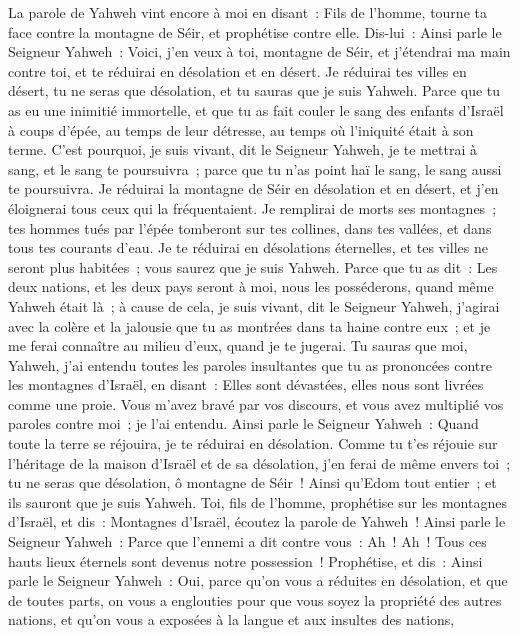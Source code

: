 \begin{multicols}{2}
\VerseOne{}La parole de Yahweh vint encore à moi en disant~:
Fils de l'homme, tourne ta face contre la montagne de Séir, et prophétise contre elle.
Dis-lui~: Ainsi parle le Seigneur Yahweh~: Voici, j'en veux à toi, montagne de Séir, et j'étendrai ma main contre toi, et te réduirai en désolation et en désert.
Je réduirai tes villes en désert, tu ne seras que désolation, et tu sauras que je suis Yahweh.
Parce que tu as eu une inimitié immortelle, et que tu as fait couler le sang des enfants d'Israël à coups d'épée, au temps de leur détresse, au temps où l'iniquité était à son terme.
C'est pourquoi, je suis vivant, dit le Seigneur Yahweh, je te mettrai à sang, et le sang te poursuivra~; parce que tu n'as point haï le sang, le sang aussi te poursuivra.
Je réduirai la montagne de Séir en désolation et en désert, et j'en éloignerai tous ceux qui la fréquentaient.
Je remplirai de morts ses montagnes~; tes hommes tués par l'épée tomberont sur tes collines, dans tes vallées, et dans tous tes courants d'eau.
Je te réduirai en désolations éternelles, et tes villes ne seront plus habitées~; vous saurez que je suis Yahweh.
Parce que tu as dit~: Les deux nations, et les deux pays seront à moi, nous les posséderons, quand même Yahweh était là~;
à cause de cela, je suis vivant, dit le Seigneur Yahweh, j'agirai avec la colère et la jalousie que tu as montrées dans ta haine contre eux~; et je me ferai connaître au milieu d'eux, quand je te jugerai.
Tu sauras que moi, Yahweh, j'ai entendu toutes les paroles insultantes que tu as prononcées contre les montagnes d'Israël, en disant~: Elles sont dévastées, elles nous sont livrées comme une proie.
Vous m'avez bravé par vos discours, et vous avez multiplié vos paroles contre moi~; je l'ai entendu.
Ainsi parle le Seigneur Yahweh~: Quand toute la terre se réjouira, je te réduirai en désolation.
Comme tu t'es réjouie sur l'héritage de la maison d'Israël et de sa désolation, j'en ferai de même envers toi~; tu ne seras que désolation, ô montagne de Séir~! Ainsi qu'Edom tout entier~; et ils sauront que je suis Yahweh.
\VerseOne{}Toi, fils de l'homme, prophétise sur les montagnes d'Israël, et dis~: Montagnes d'Israël, écoutez la parole de Yahweh~!
Ainsi parle le Seigneur Yahweh~: Parce que l'ennemi a dit contre vous~: Ah~! Ah~! Tous ces hauts lieux éternels sont devenus notre possession~!
Prophétise, et dis~: Ainsi parle le Seigneur Yahweh~: Oui, parce qu'on vous a réduites en désolation, et que de toutes parts, on vous a englouties pour que vous soyez la propriété des autres nations, et qu'on vous a exposées à la langue et aux insultes des nations,

\end{multicols}
